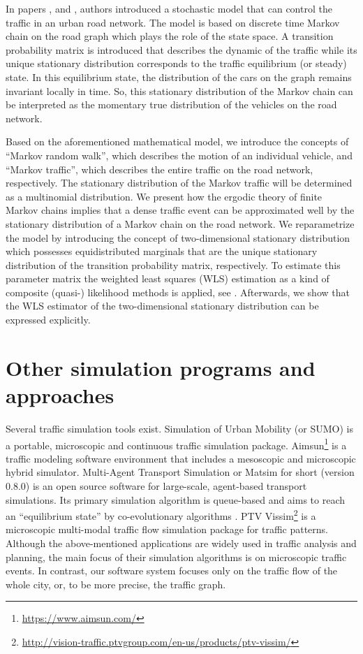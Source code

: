 \documentclass[b5paper,12pt]{report}
\theoremstyle{definition}
\begin{document}
In papers \cite{Crisostomietal2011}, \cite{Faizraetal2015} and \cite{Faizrahnemoon2016}, authors introduced a stochastic model that can control the traffic in an urban road network. The model is based on discrete time Markov chain on the road graph which plays the role of the state space. A transition probability matrix is introduced that describes the dynamic of the traffic while its unique stationary distribution corresponds to the traffic equilibrium (or steady) state. In this equilibrium state, the distribution of the cars on the graph remains invariant locally in time. So, this stationary distribution of the Markov chain can be interpreted as the momentary true distribution of the vehicles on the road network.

Based on the aforementioned mathematical model, we introduce the concepts of \enquote{Markov random walk}, which describes the motion of an individual vehicle, and \enquote{Markov traffic}, which describes the entire traffic on the road network, respectively. The stationary distribution of the Markov traffic will be determined as a multinomial distribution. We present how the ergodic theory of finite Markov chains implies that a dense traffic event can be approximated well by the stationary distribution of a Markov chain on the road network. We reparametrize the model by introducing the concept of two-dimensional stationary distribution which possesses equidistributed marginals that are the unique stationary distribution of the transition probability matrix, respectively. To estimate this parameter matrix the weighted least squares (WLS) estimation as a kind of composite (quasi-) likelihood methods is applied, see \cite{Hjort2008Varin}. Afterwards, we show that the WLS estimator of the two-dimensional stationary distribution can be expressed explicitly.

\section{Other simulation programs and approaches}

Several traffic simulation tools exist. Simulation of Urban Mobility \cite{SUMO2012} (or SUMO) is a portable, microscopic and continuous traffic simulation package. Aimsun\footnote{\url{https://www.aimsun.com/}} is a traffic modeling software environment that includes a mesoscopic and microscopic hybrid simulator. Multi-Agent Transport Simulation \cite{horni2016multi} or Matsim for short (version 0.8.0) is an open source software for large-scale, agent-based transport simulations. Its primary simulation algorithm is queue-based \cite{Charypara} and aims to reach an \enquote{equilibrium state} by co-evolutionary algorithms \cite{popovici2012coevolutionary}. PTV Vissim\footnote{\url{http://vision-traffic.ptvgroup.com/en-us/products/ptv-vissim/}} is a microscopic multi-modal traffic flow simulation package for traffic patterns. Although the above-mentioned applications are widely used in traffic analysis and planning, the main focus of their simulation algorithms is on microscopic traffic events. In contrast, our software system focuses only on the traffic flow of the whole city, or, to be more precise, the traffic graph.
\end{document}
